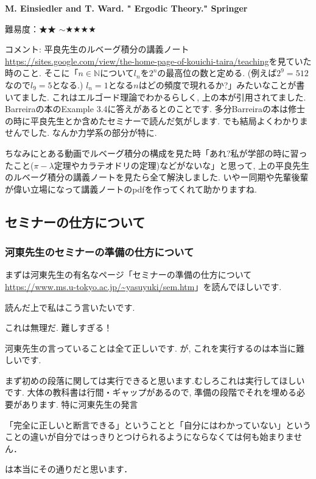 \textbf{M. Einsiedler and T. Ward. " Ergodic Theory." Springer }  　\vspace{-6pt} 

難易度：★★ $\sim$★★★★\vspace{-6pt} 

コメント: 平良先生のルベーグ積分の講義ノート\url{https://sites.google.com/view/the-home-page-of-kouichi-taira/teaching}を見ていた時のこと. 
そこに「$n \in \mathbb{N}$について$l_n$を$2^{n}$の最高位の数と定める. (例えば$2^9=512$なので$l_9=5$となる.) $l_n=1$となる$n$はどの頻度で現れるか?」みたいなことが書いてました.
これはエルゴード理論でわかるらしく, 上の本が引用されてました. 
Barreiraの本のExample 3.4に答えがあるとのことです. 
多分Barreiraの本は修士の時に平良先生とか含めたセミナーで読んだ気がします. でも結局よくわかりませんでした. なんか力学系の部分が特に. 

ちなみにとある動画でルベーグ積分の構成を見た時「あれ?私が学部の時に習ったこと($\pi-\lambda$定理やカラテオドリの定理)などがないな」と思って, 上の平良先生のルベーグ積分の講義ノートを見たら全て解決しました. いやー同期や先輩後輩が偉い立場になって講義ノートのpdfを作ってくれて助かりますね. 

\vspace{8pt}


\subsection{セミナーの仕方について}
\label{subsec-seminar}
\subsubsection{河東先生のセミナーの準備の仕方について}
まずは河東先生の有名なページ「セミナーの準備の仕方について \url{https://www.ms.u-tokyo.ac.jp/~yasuyuki/sem.htm}」を読んでほしいです.

読んだ上で私はこう言いたいです. 
\begin{tcolorbox}[mybox]
\begin{center}
これは無理だ. 難しすぎる！
\end{center}
\end{tcolorbox}
河東先生の言っていることは全て正しいです. 
が, これを実行するのは本当に難しいです. 

まず初めの段落に関しては実行できると思います.むしろこれは実行してほしいです. 
大体の教科書は行間・ギャップがあるので, 準備の段階でそれを埋める必要があります. 
特に河東先生の発言
\begin{tcolorbox}[mybox]
「完全に正しいと断言できる」ということと「自分にはわかっていない」ということの違いが自分ではっきりとつけられるようにならなくては何も始まりません．
\end{tcolorbox}
は本当にその通りだと思います．

